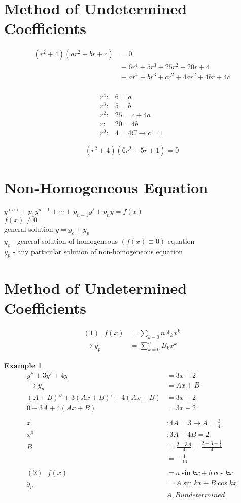 \documentclass[10pt, letterpaper]{article}
\begin{document}
\section{Method of Undetermined Coefficients}
\begin{align*}
(r^2 + 4)(ar^2 + br + c) &= 0\\
&\equiv 6r^4 + 5r^3 + 25r^2 + 20r + 4\\
&\equiv ar^4 + br^3 + cr^2 + 4ar^2 + 4br + 4c\\
\end{align*}

\begin{align*}
r^4:& 6 = a\\
r^3:& 5 = b\\
r^2:& 25 = c+4a\\
r:& 20 = 4b\\
r^0:& 4 = 4C \rightarrow c=1
\end{align*}

\begin{align*}
(r^2 + 4)(6r^2 + 5r + 1)=0
\end{align*}


\section{Non-Homogeneous Equation}
$y^{(n)} +p_1y^{n-1} +\cdots +p_{n-1}y' +p_ny =f(x)$\\
$f(x) \neq 0$\\
general solution $y=y_c+y_p$\\
$y_c$ - general solution of homogeneous $(f(x)\equiv0)$ equation\\
$y_p$ - any particular solution of non-homogeneous equation\\

\section{Method of Undetermined Coefficients}
\begin{align*}
(1) ~~~ f(x) &= \sum_{k-0}{n} A_kx^k\\
\rightarrow y_p &= \sum_{k=0}^{n} B_kx^k
\end{align*}

\textbf{Example 1}
\begin{align*}
y''+3y'+4y &= 3x+2\\
\rightarrow y_p &= Ax+B\\
(A+B)'' +3(Ax+B)' +4(Ax+B) &= 3x+2\\
0 +3A +4(Ax+B) &= 3x+2\\
\\
x &: 4A =3 \rightarrow A=\frac{3}{4}\\
x^0 &: 3A+4B =2\\
B &=\frac{2-3A}{4} =\frac{2-3-\frac{3}{4}}{4}\\
&= -\frac{1}{16}\\
\\
(2) ~~~ f(x) &= a \sin kx + b \cos kx\\
y_p &= A \sin kx + B \cos kx\\
&A, B undetermined
\end{align*}
\end{document}
